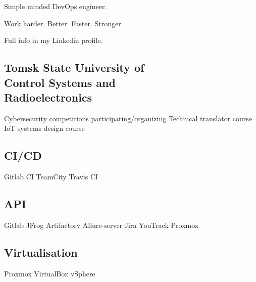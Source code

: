 \documentclass[a4paper]{MagicalCV}
\begin{document}
\lastupdated


\begin{minipage}[t]{0.34\textwidth} 


Simple minded DevOps engineer.

Work harder. Better. Faster. Stronger.

Full info in my Linkedin profile.
\sectionsep





\sectionsep


\subsection{Tomsk State University of \\ Control Systems and \\ Radioelectronics}
\vspace{\topsep} %
Cybersecurity competitions participating/organizing \textbullet{} Technical translator course \textbullet{} IoT systems design course
\sectionsep


\subsection{CI/CD}
Gitlab CI \textbullet{} 
TeamCity \textbullet{} 
Travis CI 
\subsection{API}
Gitlab \textbullet{} 
JFrog Artifactory \textbullet{} 
Allure-server \textbullet{}
Jira \textbullet{} 
YouTrack \textbullet{} 
Proxmox
\subsection{Virtualisation}
Proxmox \textbullet{} 
VirtualBox \textbullet{} 
vSphere 

\end{minipage}
\end{document}
